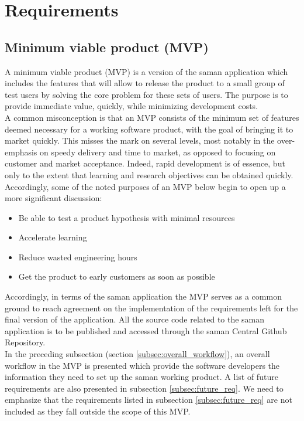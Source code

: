 \section{Requirements}

\subsection{Minimum viable product (MVP)}

\noindent A minimum viable product (MVP) is a version of the saman application which includes the features that will allow to release the product to a small group of test users by solving the core problem for these sets of users. The purpose is to provide immediate value, quickly, while minimizing development costs.\\

\noindent A common misconception is that an MVP consists of the minimum set of features deemed necessary for a working software product, with the goal of bringing it to market quickly. This misses the mark on several levels, most notably in the over-emphasis on speedy delivery and time to market, as opposed to focusing on customer and market acceptance. Indeed, rapid development is of essence, but only to the extent that learning and research objectives can be obtained quickly. Accordingly, some of the noted purposes of an MVP below begin to open up a more significant discussion:
\begin{itemize}
    \item Be able to test a product hypothesis with minimal resources
    \item Accelerate learning
    \item Reduce wasted engineering hours
    \item Get the product to early customers as soon as possible 
\end{itemize}

\noindent Accordingly, in terms of the saman application the MVP serves as a common ground to reach agreement on the implementation of the requirements left for the final version of the application. All the source code related to the saman application is to be published and accessed through the saman Central Github Repository.\\

\noindent In the preceding subsection (section \ref{subsec:overall_workflow}), an overall workflow in the MVP is presented which provide the software developers the information they need to set up the saman working product. A list of future requirements are also presented in subsection \ref{subsec:future_req}. We need to emphasize that the requirements listed in subsection \ref{subsec:future_req} are not included as they fall outside the scope of this MVP.

